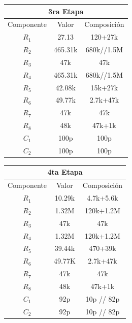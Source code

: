\begin{table}[H]
\centering
\begin{tabular}{ccc}
\multicolumn{3}{c}{3ra Etapa}                                              \\ \hline
\multicolumn{1}{c|}{Componente} & \multicolumn{1}{c|}{Valor} & Composición \\ \hline
$R_1$                           & 27.13                      & 120+27k     \\
$R_2$                           & 465.31k                    & 680k//1.5M  \\
$R_3$                           & 47k                        & 47k         \\
$R_4$                           & 465.31k                    & 680k//1.5M  \\
$R_5$                           & 42.08k                     & 15k+27k     \\
$R_6$                           & 49.77k                     & 2.7k+47k    \\
$R_7$                           & 47k                        & 47k         \\
$R_8$                           & 48k                        & 47k+1k         \\
$C_1$                           & 100p                       & 100p        \\
$C_2$                           & 100p                       & 100p       
\end{tabular}
\end{table}
\begin{table}[H]
\centering
\begin{tabular}{ccc}
\multicolumn{3}{c}{4ta Etapa}                                              \\ \hline
\multicolumn{1}{c|}{Componente} & \multicolumn{1}{c|}{Valor} & Composición \\ \hline
$R_1$                           & 10.29k                     & 4.7k+5.6k   \\
$R_2$                           & 1.32M                      & 120k+1.2M   \\
$R_3$                           & 47k                        & 47k         \\
$R_4$                           & 1.32M                      & 120k+1.2M   \\
$R_5$                           & 39.44k                     & 470+39k     \\
$R_6$                           & 49.77K                     & 2.7k+47k    \\
$R_7$                           & 47k                        & 47k         \\
$R_8$                           & 48k                        & 47k+1k         \\
$C_1$                           & 92p                        & 10p // 82p  \\
$C_2$                           & 92p                        & 10p // 82p 
\end{tabular}
\end{table}
